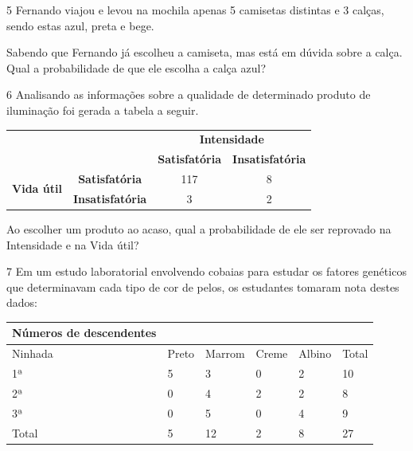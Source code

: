 \pagebreak
\num{5} Fernando viajou e levou na mochila apenas 5 camisetas distintas e 3
calças, sendo estas azul, preta e bege.

Sabendo que Fernando já escolheu a camiseta, mas está em dúvida sobre a
calça. Qual a probabilidade de que ele escolha a calça azul?

\begin{emptybox}
\end{emptybox}

\num{6} Analisando as informações sobre a qualidade de determinado produto de
iluminação foi gerada a tabela a seguir.

\begin{tabular}{lc|cc|}
\cline{3-4}
\multicolumn{2}{l|}{\multirow{2}{*}{}} & \multicolumn{2}{c|}{\textbf{Intensidade}} \\ \cline{3-4} 
\multicolumn{2}{l|}{} & \multicolumn{1}{c|}{\textbf{Satisfatória}} & \textbf{Insatisfatória} \\ \hline
\multicolumn{1}{|c|}{\multirow{2}{*}{\textbf{Vida útil}}} & \textbf{Satisfatória} & \multicolumn{1}{c|}{117} & 8 \\ \cline{2-4} 
\multicolumn{1}{|c|}{} & \textbf{Insatisfatória} & \multicolumn{1}{c|}{3} & 2 \\ \hline
\end{tabular}

Ao escolher um produto ao acaso, qual a probabilidade de ele ser
reprovado na Intensidade e na Vida útil?

\begin{emptybox}
\end{emptybox}

\num{7} Em um estudo laboratorial envolvendo cobaias para estudar os fatores
genéticos que determinavam cada tipo de cor de pelos, os estudantes
tomaram nota destes dados:

\begin{longtable}[]{@{}llllll@{}}
\toprule
\textbf{Números de descendentes}\tabularnewline
\midrule
\endhead
Ninhada & Preto & Marrom & Creme & Albino & Total\tabularnewline
1ª & 5 & 3 & 0 & 2 & 10\tabularnewline
2ª & 0 & 4 & 2 & 2 & 8\tabularnewline
3ª & 0 & 5 & 0 & 4 & 9\tabularnewline
Total & 5 & 12 & 2 & 8 & 27\tabularnewline
\bottomrule
\end{longtable}

